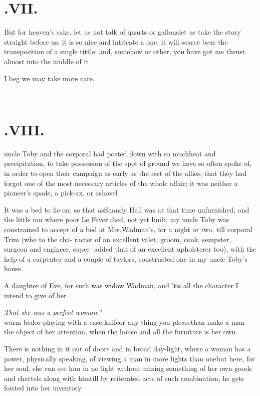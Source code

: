 \documentclass{article}
\begin{document}
\section{.\enspace VII.}

\quad\tsk But for heaven’s sake, let us not talk of quarts or
gallons\tsk let us take\break 
the story straight before us; it is so nice\break
and intricate a one, it will scarce bear the
transposition of a single tittle; and, somehow or other, you have
got me thrust almost into the middle of it\tsk

\tsh I beg we may take more care.

\vfill{}\eject
\null\kern-\baselineskip
\section{.\enspace VIII.}

 uncle Toby and the corporal
had posted down with so much\break heat and precipitation, to take
possession of the spot of ground we have so often spoke of, in
order to open their campaign as early as the rest of the allies;
that they had forgot one of the most necessary articles of the
whole affair; it was neither a pioneer’s spade, a pick-ax, or
a\break shovel\tsk

\tsh It was a bed to lie on: so that as\break Shandy Hall was
at that time unfurn\-ish\-ed; and the little inn where poor Le
Fever died, not yet built; my uncle Toby was constrained
to accept of a bed at Mrs.\@ Wadman’s, for a night or
two, 
till corporal Trim (who to the cha-\break
racter of an excellent valet, groom, cook,\break
sempster, surgeon and engineer, super-\break
added that of an excellent upholsterer\break
too), with the help of a carpenter and a\break
couple of taylors, constructed one in my\break
uncle Toby’s house.

A daughter of Eve, for such was widow Wadman, and
’tis all the character I intend to give of her\tsk 

\tsk\lqq\textit{That she was a perfect woman};”\\[6pt]
warm bed\tsk or playing with a case-knife\break\tsk or any thing
you please\tsk than make a man the object of her attention,
when\break
the house and all the furniture is her own.

There is nothing in it out of doors and in broad day-light,
where a woman has a power, physically speaking, of viewing a man in
more lights than one\tsk but here, for her soul, she can see him
in no light without mixing something of her own goods and chattels
along with him\tsh till by reiterated acts of such
combination, he gets foisted into her inventory\tsh
\end{document}
